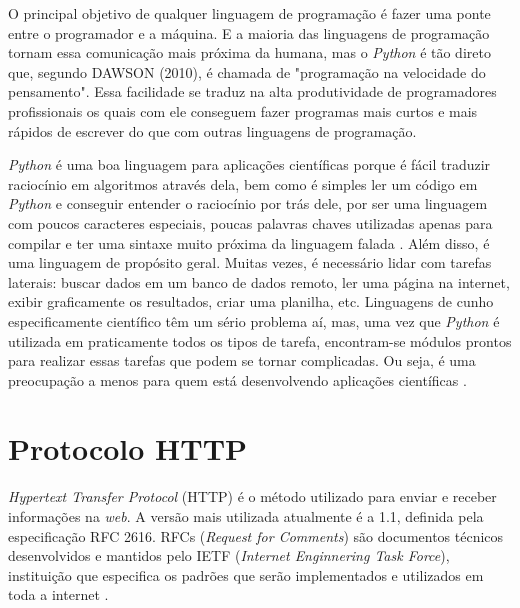 O principal objetivo de qualquer linguagem de programação é fazer uma ponte entre o programador e a máquina. E a maioria das linguagens de programação tornam essa comunicação mais próxima da humana, mas o \textit{Python} é tão direto que, segundo DAWSON (2010), é chamada de "programação na velocidade do pensamento". Essa facilidade se traduz na alta produtividade de programadores profissionais os quais com ele conseguem fazer programas mais curtos e mais rápidos de escrever do que com outras linguagens de programação. 

\textit{Python} é uma boa linguagem para aplicações científicas porque é fácil traduzir raciocínio em algoritmos através dela, bem como é simples ler um código em \textit{Python} e conseguir entender o raciocínio por trás dele, por ser uma linguagem com poucos caracteres especiais, poucas palavras chaves utilizadas apenas para compilar e ter uma sintaxe muito próxima da linguagem falada \cite{reitz2018}. Além disso, é uma linguagem de propósito geral. Muitas vezes, é necessário lidar com tarefas laterais: buscar dados em um banco de dados remoto, ler uma página na internet, exibir graficamente os resultados, criar uma planilha, etc. Linguagens de cunho especificamente científico têm um sério problema aí, mas, uma vez que \textit{Python} é utilizada em praticamente todos os tipos de tarefa, encontram-se módulos prontos para realizar essas tarefas que podem se tornar complicadas. Ou seja, é uma preocupação a menos para quem está desenvolvendo aplicações científicas \cite{downey2012}.
  

\section{Protocolo HTTP}

\textit{Hypertext Transfer Protocol} (HTTP)  é o método utilizado para enviar e receber informações na \textit{web}.  A versão mais utilizada atualmente é a 1.1, definida pela especificação RFC 2616. RFCs (\textit{Request for Comments}) são documentos técnicos desenvolvidos e mantidos pelo IETF (\textit{Internet Enginnering Task Force}), instituição que especifica os padrões que serão implementados e utilizados em toda a internet \cite{vieira2007}.

